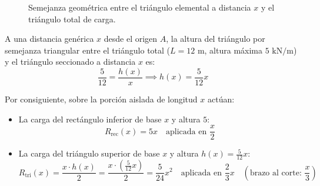 \begin{figure}[H]
{%
    }
    \caption{Semejanza geométrica entre el triángulo elemental a distancia $x$ y el triángulo total de carga.}
    \label{fig:ejemplo4_semejanza}
\end{figure}

A una distancia genérica $x$ desde el origen $A$, la altura del triángulo por semejanza triangular entre el triángulo total ($L=12\text{ m}$, altura máxima $5\text{ kN/m}$) y el triángulo seccionado a distancia $x$ es:
\begin{equation}
    \frac{5}{12} = \frac{h(x)}{x} \implies \boxed{h(x) = \frac{5}{12}x}
\end{equation}

Por consiguiente, sobre la porción aislada de longitud $x$ actúan:
\begin{itemize}
    \item La carga del rectángulo inferior de base $x$ y altura $5$:
          \[
              R_{\text{rec}}(x) = 5x \quad \text{aplicada en } \frac{x}{2}
          \]
    \item La carga del triángulo superior de base $x$ y altura $h(x) = \frac{5}{12}x$:
          \[
              R_{\text{tri}}(x) = \frac{x \cdot h(x)}{2} = \frac{x \cdot \left(\frac{5}{12}x\right)}{2} = \frac{5}{24}x^2 \quad \text{aplicada en } \frac{2}{3}x \quad \left(\text{brazo al corte: } \frac{x}{3}\right)
          \]
\end{itemize}

